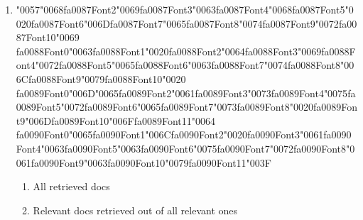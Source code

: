 \documentclass[12pt]{article}
\begin{document}
\begin{enumerate}[label=Q\arabic*.]
\begin{enumerate}[label=(\Alph*)]
    \item Backpropagates through retrieval to update encoders
    \item Byte-pair encoding to compress queries
    \item Learned neural embeddings for queries and documents
    \item Document-length normalization and tunable term saturation on term frequency
\end{enumerate}
\item {\char"0057}{\char"0068}{\csname fa0087Font2\endcsname\char"0069}{\csname fa0087Font3\endcsname\char"0063}{\csname fa0087Font4\endcsname\char"0068}{\csname fa0087Font5\endcsname\char"0020}{\csname fa0087Font6\endcsname\char"006D}{\csname fa0087Font7\endcsname\char"0065}{\csname fa0087Font8\endcsname\char"0074}{\csname fa0087Font9\endcsname\char"0072}{\csname fa0087Font10\endcsname\char"0069} {\csname fa0088Font0\endcsname\char"0063}{\csname fa0088Font1\endcsname\char"0020}{\csname fa0088Font2\endcsname\char"0064}{\csname fa0088Font3\endcsname\char"0069}{\csname fa0088Font4\endcsname\char"0072}{\csname fa0088Font5\endcsname\char"0065}{\csname fa0088Font6\endcsname\char"0063}{\csname fa0088Font7\endcsname\char"0074}{\csname fa0088Font8\endcsname\char"006C}{\csname fa0088Font9\endcsname\char"0079}{\csname fa0088Font10\endcsname\char"0020} {\csname fa0089Font0\endcsname\char"006D}{\char"0065}{\csname fa0089Font2\endcsname\char"0061}{\csname fa0089Font3\endcsname\char"0073}{\csname fa0089Font4\endcsname\char"0075}{\csname fa0089Font5\endcsname\char"0072}{\csname fa0089Font6\endcsname\char"0065}{\csname fa0089Font7\endcsname\char"0073}{\csname fa0089Font8\endcsname\char"0020}{\csname fa0089Font9\endcsname\char"006D}{\csname fa0089Font10\endcsname\char"006F}{\csname fa0089Font11\endcsname\char"0064} {\csname fa0090Font0\endcsname\char"0065}{\csname fa0090Font1\endcsname\char"006C}{\csname fa0090Font2\endcsname\char"0020}{\csname fa0090Font3\endcsname\char"0061}{\csname fa0090Font4\endcsname\char"0063}{\csname fa0090Font5\endcsname\char"0063}{\csname fa0090Font6\endcsname\char"0075}{\csname fa0090Font7\endcsname\char"0072}{\csname fa0090Font8\endcsname\char"0061}{\csname fa0090Font9\endcsname\char"0063}{\csname fa0090Font10\endcsname\char"0079}{\csname fa0090Font11\endcsname\char"003F}
\begin{enumerate}[label=(\Alph*)]
    \item All retrieved docs
    \item Relevant docs retrieved out of all relevant ones

\end{enumerate}
\end{enumerate}
\end{document}
